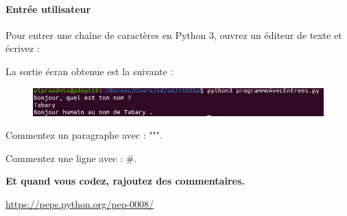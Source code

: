 \paragraph{Entrée utilisateur}


Pour entrer une chaîne de caractères en Python 3, ouvrez un éditeur de texte et
écrivez :





La sortie écran obtenue est la suivante : 

\begin{figure}[H]
    \centering
    \includegraphics[scale = 0.7]{chapitre1/figures/entree.png}
\end{figure}

\begin{tcolorbox}[lefttitle=2cm, colframe=gray!75!blue, title= \textbf{Tip for Code 1 : "\textit{code is read much more often than it is written}", Guido van Rossum}]


Commentez un paragraphe avec : """.

Commentez une ligne avec : \#.

\textbf{Et quand vous codez, rajoutez des commentaires.}

\url{https://peps.python.org/pep-0008/}

\end{tcolorbox}


